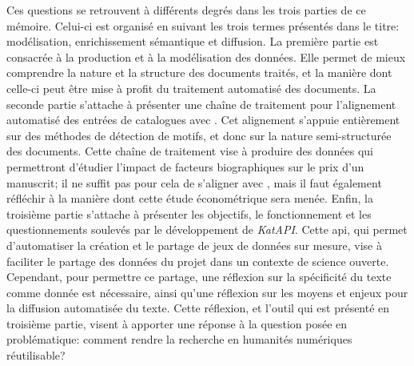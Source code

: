 Ces questions se retrouvent à différents degrés dans les trois parties de ce mémoire. Celui-ci est organisé en suivant les trois termes présentés dans le titre: modélisation, enrichissement sémantique et diffusion. La première partie est consacrée à la production et à la modélisation des données. Elle permet de mieux comprendre la nature et la structure des documents traités, et la manière dont celle-ci peut être mise à profit du traitement automatisé des documents. La seconde partie s'attache à présenter une chaîne de traitement pour l'alignement automatisé des entrées de catalogues avec \wkd{}. Cet alignement s'appuie entièrement sur des méthodes de détection de motifs, et donc sur la nature semi-structurée des documents. Cette chaîne de traitement vise à produire des données qui permettront d'étudier l'impact de facteurs biographiques sur le prix d'un manuscrit; il ne suffit pas pour cela de s'aligner avec \wkd{}, mais il faut également réfléchir à la manière dont cette étude économétrique sera menée. Enfin, la troisième partie s'attache à présenter les objectifs, le fonctionnement et les questionnements soulevés par le développement de \textit{KatAPI}. Cette \gls{api}, qui permet d'automatiser la création et le partage de jeux de données sur mesure, vise à faciliter le partage des données du projet dans un contexte de science ouverte. Cependant, pour permettre ce partage, une réflexion sur la spécificité du texte comme donnée est nécessaire, ainsi qu'une réflexion sur les moyens et enjeux pour la diffusion automatisée du texte. Cette réflexion, et l'outil qui est présenté en troisième partie, visent à apporter une réponse à la question posée en problématique: comment rendre la recherche en humanités numériques réutilisable?


